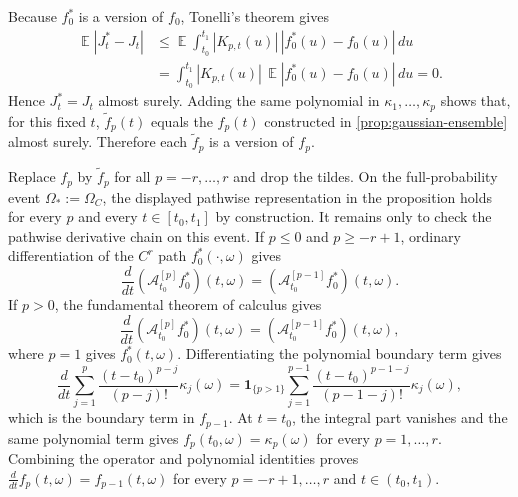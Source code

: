 \documentclass[11pt,a4paper]{article}
\theoremstyle{definition}
\theoremstyle{remark}
\DeclareMathOperator{\E}{\mathbb{E}}
\begin{document}
\begin{mainproof}
Because \(f_0^\ast\) is a version of \(f_0\), Tonelli's theorem gives
\begin{align*}
\E|J_t^\ast-J_t|
&\le \E\int_{t_0}^{t_1}|K_{p,t}(u)|\,|f_0^\ast(u)-f_0(u)|\,du\\
&=\int_{t_0}^{t_1}|K_{p,t}(u)|\,\E|f_0^\ast(u)-f_0(u)|\,du
=0.
\end{align*}
Hence \(J_t^\ast=J_t\) almost surely. Adding the same polynomial in \(\kappa_1,\ldots,\kappa_p\) shows that, for this fixed \(t\), \(\tilde f_p(t)\) equals the \(f_p(t)\) constructed in \cref{prop:gaussian-ensemble} almost surely. Therefore each \(\tilde f_p\) is a version of \(f_p\).

Replace \(f_p\) by \(\tilde f_p\) for all \(p=-r,\ldots,r\) and drop the tildes. On the full-probability event \(\Omega_\ast:=\Omega_C\), the displayed pathwise representation in the proposition holds for every \(p\) and every \(t\in[t_0,t_1]\) by construction. It remains only to check the pathwise derivative chain on this event. If \(p\le0\) and \(p\ge-r+1\), ordinary differentiation of the \(C^r\) path \(f_0^\ast(\cdot,\omega)\) gives
\[
\frac{d}{dt}(\mathcal A_{t_0}^{[p]}f_0^\ast)(t,\omega)=(\mathcal A_{t_0}^{[p-1]}f_0^\ast)(t,\omega).
\]
If \(p>0\), the fundamental theorem of calculus gives
\[
\frac{d}{dt}(\mathcal A_{t_0}^{[p]}f_0^\ast)(t,\omega)=(\mathcal A_{t_0}^{[p-1]}f_0^\ast)(t,\omega),
\]
where \(p=1\) gives \(f_0^\ast(t,\omega)\). Differentiating the polynomial boundary term gives
\[
\frac{d}{dt}\sum_{j=1}^{p}\frac{(t-t_0)^{p-j}}{(p-j)!}\kappa_j(\omega)
=\mathbf 1_{\{p>1\}}\sum_{j=1}^{p-1}\frac{(t-t_0)^{p-1-j}}{(p-1-j)!}\kappa_j(\omega),
\]
which is the boundary term in \(f_{p-1}\). At \(t=t_0\), the integral part vanishes and the same polynomial term gives \(f_p(t_0,\omega)=\kappa_p(\omega)\) for every \(p=1,\ldots,r\). Combining the operator and polynomial identities proves \(\frac{d}{dt}f_p(t,\omega)=f_{p-1}(t,\omega)\) for every \(p=-r+1,\ldots,r\) and \(t\in(t_0,t_1)\).
\end{mainproof}
\end{document}
